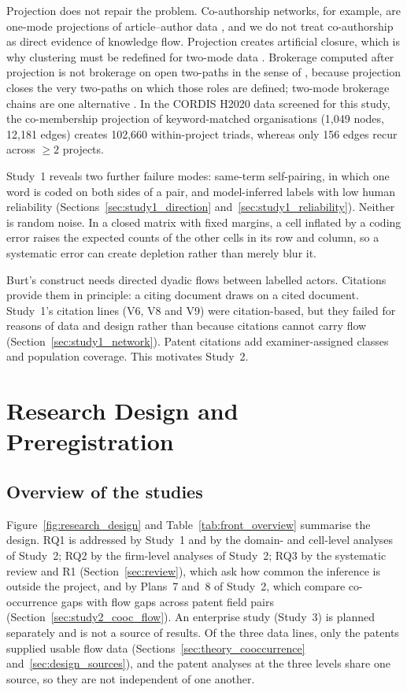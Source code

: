 Projection does not repair the problem. Co-authorship networks, for example, are one-mode projections of article--author data \citep{newman2001scientific}, and we do not treat co-authorship as direct evidence of knowledge flow. Projection creates artificial closure, which is why clustering must be redefined for two-mode data \citep{opsahl2013triadic}. Brokerage computed after projection is not brokerage on open two-paths in the sense of \citet{gould1989structures}, because projection closes the very two-paths on which those roles are defined; two-mode brokerage chains are one alternative \citep{jasny2015two}. In the CORDIS H2020 data screened for this study, the co-membership projection of keyword-matched organisations (1,049 nodes, 12,181 edges) creates 102,660 within-project triads, whereas only 156 edges recur across $\geq 2$ projects.

Study~1 reveals two further failure modes: same-term self-pairing, in which one word is coded on both sides of a pair, and model-inferred labels with low human reliability (Sections~\ref{sec:study1_direction} and~\ref{sec:study1_reliability}). Neither is random noise. In a closed matrix with fixed margins, a cell inflated by a coding error raises the expected counts of the other cells in its row and column, so a systematic error can create depletion rather than merely blur it.

Burt's construct needs directed dyadic flows between labelled actors. Citations provide them in principle: a citing document draws on a cited document. Study~1's citation lines (V6, V8 and V9) were citation-based, but they failed for reasons of data and design rather than because citations cannot carry flow (Section~\ref{sec:study1_network}). Patent citations add examiner-assigned classes and population coverage. This motivates Study~2.

\section{Research Design and Preregistration}
\label{sec:design}

\subsection{Overview of the studies}
\label{sec:design_overview}

Figure~\ref{fig:research_design} and Table~\ref{tab:front_overview} summarise the design. RQ1 is addressed by Study~1 and by the domain- and cell-level analyses of Study~2; RQ2 by the firm-level analyses of Study~2; RQ3 by the systematic review and R1 (Section~\ref{sec:review}), which ask how common the inference is outside the project, and by Plans~7 and~8 of Study~2, which compare co-occurrence gaps with flow gaps across patent field pairs (Section~\ref{sec:study2_cooc_flow}). An enterprise study (Study~3) is planned separately and is not a source of results. Of the three data lines, only the patents supplied usable flow data (Sections~\ref{sec:theory_cooccurrence} and~\ref{sec:design_sources}), and the patent analyses at the three levels share one source, so they are not independent of one another.

